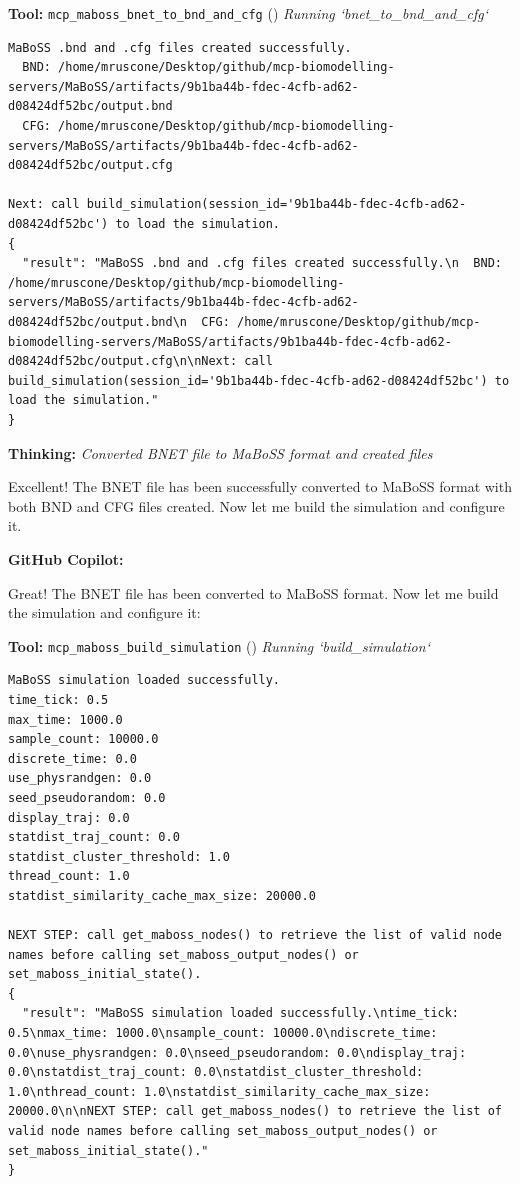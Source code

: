 \documentclass[11pt,a4paper]{article}
\begin{document}
\begin{toolokbox}
\textbf{Tool:} \texttt{mcp\_maboss\_bnet\_to\_bnd\_and\_cfg} (\checkmark)
\textit{Running `bnet\_to\_bnd\_and\_cfg`}
\begin{lstlisting}
MaBoSS .bnd and .cfg files created successfully.
  BND: /home/mruscone/Desktop/github/mcp-biomodelling-servers/MaBoSS/artifacts/9b1ba44b-fdec-4cfb-ad62-d08424df52bc/output.bnd
  CFG: /home/mruscone/Desktop/github/mcp-biomodelling-servers/MaBoSS/artifacts/9b1ba44b-fdec-4cfb-ad62-d08424df52bc/output.cfg

Next: call build_simulation(session_id='9b1ba44b-fdec-4cfb-ad62-d08424df52bc') to load the simulation.
{
  "result": "MaBoSS .bnd and .cfg files created successfully.\n  BND: /home/mruscone/Desktop/github/mcp-biomodelling-servers/MaBoSS/artifacts/9b1ba44b-fdec-4cfb-ad62-d08424df52bc/output.bnd\n  CFG: /home/mruscone/Desktop/github/mcp-biomodelling-servers/MaBoSS/artifacts/9b1ba44b-fdec-4cfb-ad62-d08424df52bc/output.cfg\n\nNext: call build_simulation(session_id='9b1ba44b-fdec-4cfb-ad62-d08424df52bc') to load the simulation."
}
\end{lstlisting}
\end{toolokbox}
\begin{thinkbox}
\textbf{Thinking:} \textit{Converted BNET file to MaBoSS format and created files}

Excellent! The BNET file has been successfully converted to MaBoSS format with both BND and CFG files created. Now let me build the simulation and configure it.

\end{thinkbox}
\begin{copilotbox}
\textbf{GitHub Copilot:}

Great! The BNET file has been converted to MaBoSS format. Now let me build the simulation and configure it:

\end{copilotbox}
\begin{toolokbox}
\textbf{Tool:} \texttt{mcp\_maboss\_build\_simulation} (\checkmark)
\textit{Running `build\_simulation`}
\begin{lstlisting}
MaBoSS simulation loaded successfully.
time_tick: 0.5
max_time: 1000.0
sample_count: 10000.0
discrete_time: 0.0
use_physrandgen: 0.0
seed_pseudorandom: 0.0
display_traj: 0.0
statdist_traj_count: 0.0
statdist_cluster_threshold: 1.0
thread_count: 1.0
statdist_similarity_cache_max_size: 20000.0

NEXT STEP: call get_maboss_nodes() to retrieve the list of valid node names before calling set_maboss_output_nodes() or set_maboss_initial_state().
{
  "result": "MaBoSS simulation loaded successfully.\ntime_tick: 0.5\nmax_time: 1000.0\nsample_count: 10000.0\ndiscrete_time: 0.0\nuse_physrandgen: 0.0\nseed_pseudorandom: 0.0\ndisplay_traj: 0.0\nstatdist_traj_count: 0.0\nstatdist_cluster_threshold: 1.0\nthread_count: 1.0\nstatdist_similarity_cache_max_size: 20000.0\n\nNEXT STEP: call get_maboss_nodes() to retrieve the list of valid node names before calling set_maboss_output_nodes() or set_maboss_initial_state()."
}
\end{lstlisting}
\end{toolokbox}
\end{document}
